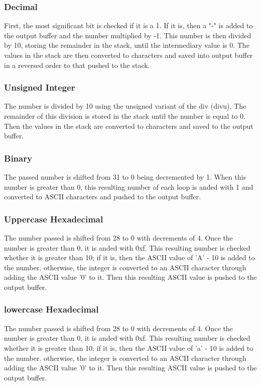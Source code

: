 \documentclass[12pt,a4paper]{article}
\begin{document}
\subsubsection{Decimal}
First, the most significant bit is checked if it is a 1. If it is, then a "-" is added to the output buffer and the number multiplied by -1. This number is then divided by 10, storing the remainder in the stack, until the intermediary value is 0. The values in the stack are then converted to characters and saved into output buffer in a reversed order to that pushed to the stack.

\subsubsection{Unsigned Integer}
The number is divided by 10 using the unsigned variant of the div (divu). The remainder of this division is stored in the stack until the number is equal to 0. Then the values in the stack are converted to characters and saved to the output buffer.

\subsubsection{Binary}
The passed number is shifted from 31 to 0 being decremented by 1. When this number is greater than 0, this resulting number of each loop is anded with 1 and converted to ASCII characters and pushed to the output buffer.

\subsubsection{Uppercase Hexadecimal}
The number passed is shifted from 28 to 0 with decrements of 4. Once the number is greater than 0, it is anded with 0xf. This resulting number is checked whether it is greater than 10; if it is, then the ASCII value of 'A' - 10 is added to the number. otherwise, the integer is converted to an ASCII character through adding the ASCII value '0' to it. Then this resulting ASCII value is pushed to the output buffer.

\subsubsection{lowercase Hexadecimal}
The number passed is shifted from 28 to 0 with decrements of 4. Once the number is greater than 0, it is anded with 0xf. This resulting number is checked whether it is greater than 10; if it is, then the ASCII value of 'a' - 10 is added to the number. otherwise, the integer is converted to an ASCII character through adding the ASCII value '0' to it. Then this resulting ASCII value is pushed to the output buffer.
\end{document}
